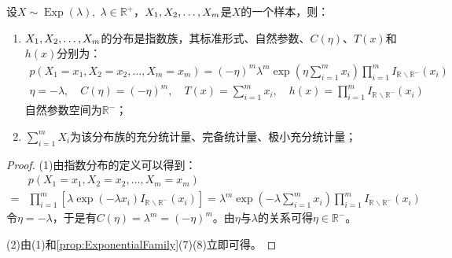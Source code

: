 \begin{theorem}
	设$X\sim\operatorname{Exp}(\lambda),\;\lambda\in\mathbb{R}^{+}$，$X_1, X_2, \dots, X_{m}$是$X$的一个样本，则：
	\begin{enumerate}
		\item $X_1, X_2, \dots, X_{m}$的分布是指数族，其标准形式、自然参数、$C(\eta)$、$T(x)$和$h(x)$分别为：
		\begin{gather*}
			p(X_1=x_1,X_2=x_2,\dots,X_m=x_m) =(-\eta)^m\lambda^m\exp\left(\eta\sum_{i=1}^{m}x_i\right)\prod_{i=1}^mI_{\mathbb{R}^{}\backslash\mathbb{R}^{-}}(x_i) \\
			\eta=-\lambda,\quad C(\eta)=(-\eta)^m,\quad
			T(x)=\sum_{i=1}^{m}x_i,\quad h(x)=\prod_{i=1}^{m}I_{\mathbb{R}^{}\backslash\mathbb{R}^{-}}(x_i)
		\end{gather*}
		自然参数空间为$\mathbb{R}^{-}$；
		\item $\sum\limits_{i=1}^{m}X_i$为该分布族的充分统计量、完备统计量、极小充分统计量；
	\end{enumerate}
\end{theorem}
\begin{proof}
	(1)由指数分布的定义可以得到：
	\begin{align*}
		&p(X_1=x_1,X_2=x_2,\dots,X_m=x_m) \\
		=&\prod_{i=1}^{m}\left[\lambda\exp(-\lambda x_i)I_{\mathbb{R}^{}\backslash\mathbb{R}^{-}}(x_i)\right]=\lambda^m\exp\left(-\lambda\sum_{i=1}^{m}x_i\right)\prod_{i=1}^mI_{\mathbb{R}^{}\backslash\mathbb{R}^{-}}(x_i)
	\end{align*}
	令$\eta=-\lambda$，于是有$C(\eta)=\lambda^m=(-\eta)^m$。由$\eta$与$\lambda$的关系可得$\eta\in\mathbb{R}^{-}$。\par
	(2)由(1)和\cref{prop:ExponentialFamily}(7)(8)立即可得。
\end{proof}

